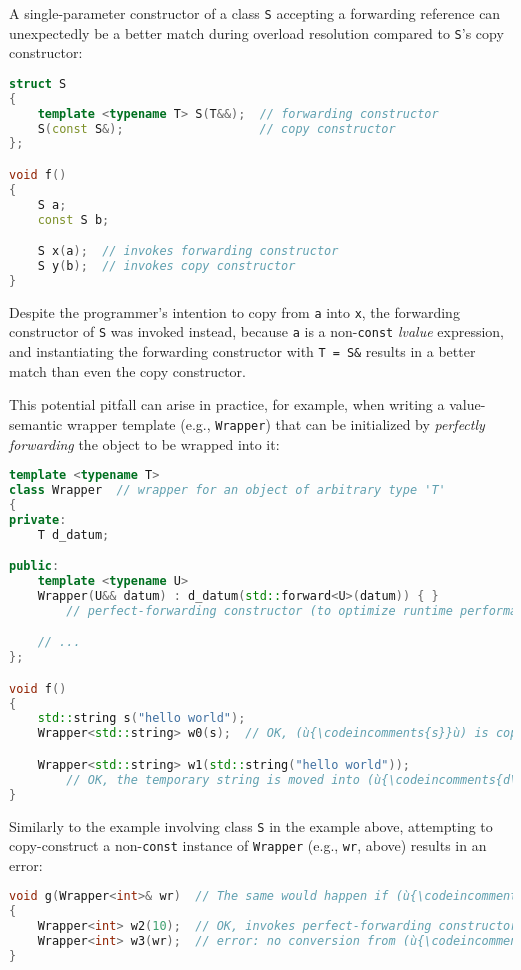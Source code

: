 A single-parameter constructor of a class \texttt{S} accepting a
forwarding reference can unexpectedly be a better match during overload
resolution compared to \texttt{S}'s copy constructor:

\begin{lstlisting}[language=C++]
struct S
{
    template <typename T> S(T&&);  // forwarding constructor
    S(const S&);                   // copy constructor
};

void f()
{
    S a;
    const S b;

    S x(a);  // invokes forwarding constructor
    S y(b);  // invokes copy constructor
}
\end{lstlisting}

\noindent Despite the programmer's intention to copy from \texttt{a} into
\texttt{x}, the forwarding constructor of \texttt{S} was invoked
instead, because \texttt{a} is a non-\texttt{const} \emph{lvalue}
expression, and instantiating the forwarding constructor with
\texttt{T}~\texttt{=}~\texttt{S\&} results in a better match than even
the copy constructor.

This potential pitfall can arise in practice, for example, when writing
a value-semantic wrapper template (e.g., \texttt{Wrapper}) that can be
initialized by \textit{perfectly forwarding} the object to be wrapped into it:

\begin{lstlisting}[language=C++]
template <typename T>
class Wrapper  // wrapper for an object of arbitrary type 'T'
{
private:
    T d_datum;

public:
    template <typename U>
    Wrapper(U&& datum) : d_datum(std::forward<U>(datum)) { }
        // perfect-forwarding constructor (to optimize runtime performance)

    // ...
};

void f()
{
    std::string s("hello world");
    Wrapper<std::string> w0(s);  // OK, (ù{\codeincomments{s}}ù) is copied into (ù{\codeincomments{d\_datum}}ù).

    Wrapper<std::string> w1(std::string("hello world"));
        // OK, the temporary string is moved into (ù{\codeincomments{d\_datum}}ù).
}
\end{lstlisting}

\noindent Similarly to the example involving class \texttt{S} in the example above, attempting
to copy-construct a non-\texttt{const} instance of \texttt{Wrapper}
(e.g., \texttt{wr}, above) results in an error:

\begin{lstlisting}[language=C++]
void g(Wrapper<int>& wr)  // The same would happen if (ù{\codeincomments{wr}}ù) were passed by value.
{
    Wrapper<int> w2(10);  // OK, invokes perfect-forwarding constructor
    Wrapper<int> w3(wr);  // error: no conversion from (ù{\codeincomments{Wrapper<int>}}ù) to (ù{\codeincomments{int}}ù)
}
\end{lstlisting}

